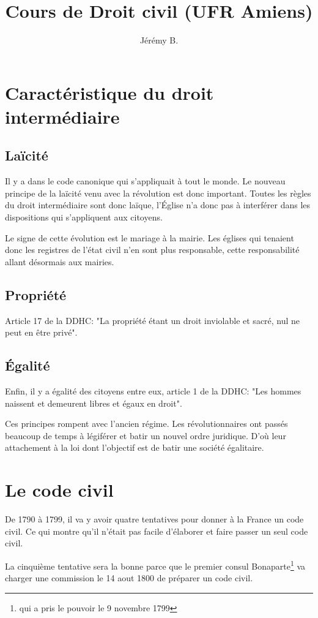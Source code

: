 \documentclass[12pt, a4paper, openany]{book}
\author{Jérémy B.}
\date{}
\title{Cours de Droit civil (UFR Amiens)}
\begin{document}
\maketitle

\section{Caractéristique du droit intermédiaire}

\subsection{Laïcité}
Il y a dans le code canonique qui s'appliquait à tout le monde. Le nouveau principe de la laïcité venu avec la révolution est donc important. Toutes les règles du droit intermédiaire sont donc laïque, l'Église n'a donc pas à interférer dans les dispositions qui s'appliquent aux citoyens.

Le signe de cette évolution est le mariage à la mairie. Les églises qui tenaient donc les registres de l'état civil n'en sont plus responsable, cette responsabilité allant désormais aux mairies.

\subsection{Propriété}
Article 17 de la DDHC: "La propriété étant un droit inviolable et sacré, nul ne peut en être privé".

\subsection{Égalité}
Enfin, il y a égalité des citoyens entre eux, article 1 de la DDHC: "Les hommes naissent et demeurent libres et égaux en droit".


Ces principes rompent avec l'ancien régime. Les révolutionnaires ont passés beaucoup de temps à légiférer et batir un nouvel ordre juridique. D'où leur attachement à la loi dont l'objectif est de batir une société égalitaire.

\section{Le code civil}
De 1790 à 1799, il va y avoir quatre tentatives pour donner à la France un code civil. Ce qui montre qu'il n'était pas facile d'élaborer et faire passer un seul code civil.

La cinquième tentative sera la bonne parce que le premier consul Bonaparte\footnote{qui a pris le pouvoir le 9 novembre 1799} va charger une commission le 14 aout 1800 de préparer un code civil.
\end{document}

